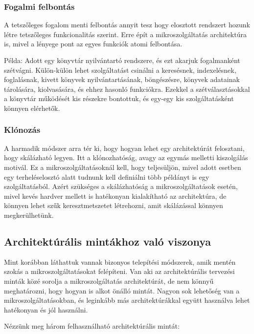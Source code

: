 \documentclass[11pt,magyar,a4paper,twoside,]{report}
\begin{document}
\subsubsection{Fogalmi felbontás}\label{fogalmi-felbontuxe1s}

A tetszőleges fogalom menti felbontás annyit tesz hogy elosztott
rendszert hozunk létre tetszőleges funkcionalitás szerint. Erre épít a
mikroszolgáltatás architektúra is, mivel a lényege pont az egyes
funkciók atomi felbontása.

Példa: Adott egy könyvtár nyilvántartó rendszere, és ezt akarjuk
fogalmanként szétvágni. Külön-külön lehet szolgáltatást csinálni a
keresésnek, indexelésnek, foglalásnak, kivett könyvek nyilvántartásának,
böngészésre, könyvek adatainak tárolására, kiolvasására, és ehhez
hasonló funkciókra. Ezekkel a szétválasztásokkal a könyvtár működését
kis részekre bontottuk, és egy-egy kis szolgáltatásként könnyen
elérhetők.

\subsubsection{Klónozás}\label{kluxf3nozuxe1s}

A harmadik módszer arra tér ki, hogy hogyan lehet egy architektúrát
felosztani, hogy skálázható legyen. Itt a klónozhatóság, avagy az egymás
melletti kiszolgálás motivál. Ez a mikroszolgáltatásoknál kell, hogy
teljesüljön, mivel adott esetben egy terheléselosztó alatt tudnunk kell
definiálni több példányt is egy szolgáltatásból. Azért szükséges a
skálázhatóság a mikroszolgáltatások esetén, mivel kevés hardver mellett
is hatékonyan kialakítható az architektúra, de könnyen lehet szűk
keresztmetszetet létrehozni, amit skálázással könnyen megkerülhetünk.

\subsection{Architektúrális mintákhoz való
viszonya}\label{architektuxfaruxe1lis-mintuxe1khoz-valuxf3-viszonya}

Mint korábban láthattuk vannak bizonyos telepítési módszerek, amik
mentén szokás a mikroszolgáltatásokat felépíteni. Van aki az
architektúrális tervezési minták közé sorolja a mikroszolgáltatás
architektúrát, de nem könnyű meghatározni, hogy hogyan is alkot önálló
mintát. Nagyon sok lehetőség van a mikroszolgáltatásokban, és leginkább
más architektúrákkal együtt használva lehet hatékonyan és jól használni.

Nézzünk meg három felhasználható architektúrális mintát:
\end{document}
